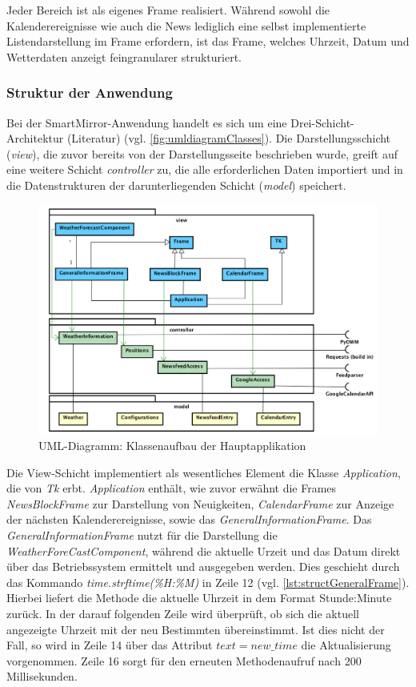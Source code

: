Jeder Bereich ist als eigenes Frame realisiert. Während sowohl die Kalenderereignisse wie auch die News lediglich eine selbst implementierte Listendarstellung im Frame erfordern, ist das Frame, welches Uhrzeit, Datum und Wetterdaten anzeigt feingranularer strukturiert.

 
\subsubsection*{Struktur der Anwendung}

Bei der SmartMirror-Anwendung handelt es sich um eine Drei-Schicht-Architektur (Literatur) (vgl. \autoref{fig:umldiagramClasses}). Die Darstellungsschicht (\textit{view}), die zuvor bereits von der Darstellungsseite  beschrieben wurde, greift auf eine weitere Schicht \textit{controller} zu, die alle erforderlichen Daten importiert und in die Datenstrukturen der darunterliegenden Schicht (\textit{model}) speichert.

\begin{figure}
	\centering
	\includegraphics[width=0.8\linewidth]{bilder/umlDiagram_v3}
	\caption[UML-Diagramm: Klassenaufbau der Hauptapplikation]{UML-Diagramm: Klassenaufbau der Hauptapplikation}
	\label{fig:umldiagramClasses}
\end{figure}

Die View-Schicht implementiert als wesentliches Element die Klasse \textit{Application}, die von \textit{Tk} erbt. 
\textit{Application} enthält, wie zuvor erwähnt die Frames \textit{NewsBlockFrame} zur Darstellung von Neuigkeiten, \textit{CalendarFrame} zur Anzeige der nächsten Kalenderereignisse, sowie das \textit{GeneralInformationFrame}. Das \textit{GeneralInformationFrame} nutzt für die Darstellung die \textit{WeatherForeCastComponent}, während die aktuelle Urzeit und das Datum direkt über das Betriebssystem ermittelt und ausgegeben werden. Dies geschieht durch das Kommando \textit{time.strftime(\grq \%H:\%M\grq)} in Zeile 12 (vgl. \autoref{lst:structGeneralFrame}). Hierbei liefert die Methode die aktuelle Uhrzeit in dem Format Stunde:Minute zurück. In der darauf folgenden Zeile wird überprüft, ob sich die aktuell angezeigte Uhrzeit mit der neu Bestimmten übereinstimmt. Ist dies nicht der Fall, so wird in Zeile 14 über das Attribut \textit{$text=new\_ time$} die Aktualisierung vorgenommen.
Zeile 16 sorgt für den erneuten Methodenaufruf nach 200 Millisekunden.

